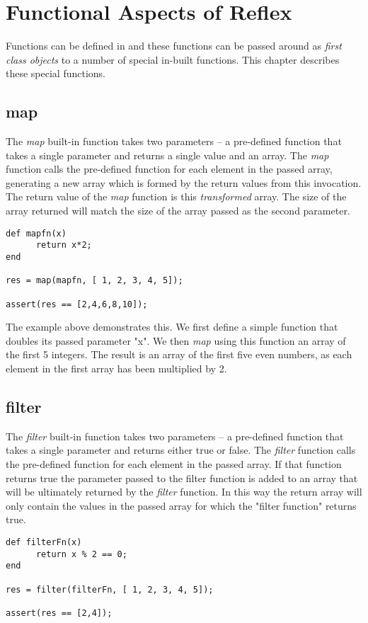 \chapter{Functional Aspects of Reflex}
Functions can be defined in \Reflex and these functions can be passed around as \emph{first class objects} to a number of special in-built functions. This chapter describes these special functions.
\section{map}
The \emph{map} built-in function takes two parameters -- a pre-defined function that takes a single parameter and returns a single value and an array. The \emph{map} function calls the pre-defined function for each element in the passed array, generating a new array which is formed by the return values from this invocation. The return value of the \emph{map} function is this \emph{transformed} array. The size of the array returned will match the size of the array passed as the second parameter.

\begin{lstlisting}[caption={Reflex map function}]
def mapfn(x)
      return x*2;
end

res = map(mapfn, [ 1, 2, 3, 4, 5]);

assert(res == [2,4,6,8,10]);
\end{lstlisting}

The example above demonstrates this. We first define a simple function that doubles its passed parameter "x". We then \emph{map} using this function an array of the first 5 integers. The result is an array of the first five even numbers, as each element in the first array has been multiplied by 2.

\section{filter}
The \emph{filter} built-in function takes two parameters -- a pre-defined function that takes a single parameter and returns either true or false. The \emph{filter} function calls the pre-defined function for each element in the passed array. If that function returns true the parameter passed to the filter function is added to an array that will be ultimately returned by the \emph{filter} function. In this way the return array will only contain the values in the passed array for which the "filter function" returns true.

\begin{lstlisting}[caption={Reflex filter function}]
def filterFn(x)
      return x % 2 == 0;
end

res = filter(filterFn, [ 1, 2, 3, 4, 5]);

assert(res == [2,4]);
\end{lstlisting}

